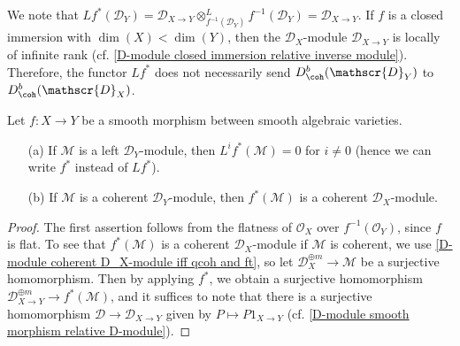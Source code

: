 \begin{remark}\label{D-module inverse image fuctor not coherent eg}
We note that $Lf^*(\mathscr{D}_Y)=\mathscr{D}_{X\to Y}\otimes_{f^{-1}(\mathscr{D}_Y)}^Lf^{-1}(\mathscr{D}_Y)=\mathscr{D}_{X\to Y}$. If $f$ is a closed immersion with $\dim(X)<\dim(Y)$, then the $\mathscr{D}_X$-module $\mathscr{D}_{X\to Y}$ is locally of infinite rank (cf. \cref{D-module closed immersion relative inverse module}). Therefore, the functor $Lf^*$ does not necessarily send $D_{\coh}^b(\mathscr{D}_Y)$ to $D_{\coh}^b(\mathscr{D}_X)$.
\end{remark}

\begin{proposition}\label{D-module derived inverse image of smooth morphism prop}
Let $f:X\to Y$ be a smooth morphism between smooth algebraic varieties.
\begin{enumerate}
    \item[(a)] If $\mathscr{M}$ is a left $\mathscr{D}_Y$-module, then $L^if^*(\mathscr{M})=0$ for $i\neq 0$ (hence we can write $f^*$ instead of $Lf^*$).
    \item[(b)] If $\mathscr{M}$ is a coherent $\mathscr{D}_Y$-module, then $f^*(\mathscr{M})$ is a coherent $\mathscr{D}_X$-module.
\end{enumerate}
\end{proposition}
\begin{proof}
The first assertion follows from the flatness of $\mathscr{O}_X$ over $f^{-1}(\mathscr{O}_Y)$, since $f$ is flat. To see that $f^*(\mathscr{M})$ is a coherent $\mathscr{D}_X$-module if $\mathscr{M}$ is coherent, we use \cref{D-module coherent D_X-module iff qcoh and ft}, so let $\mathscr{D}_X^{\oplus m}\to\mathscr{M}$ be a surjective homomorphism. Then by applying $f^*$, we obtain a surjective homomorphism $\mathscr{D}_{X\to Y}^{\oplus m}\to f^*(\mathscr{M})$, and it suffices to note that there is a surjective homomorphism $\mathscr{D}\to\mathscr{D}_{X\to Y}$ given by $P\mapsto P1_{X\to Y}$ (cf. \cref{D-module smooth morphism relative D-module}).
\end{proof}

